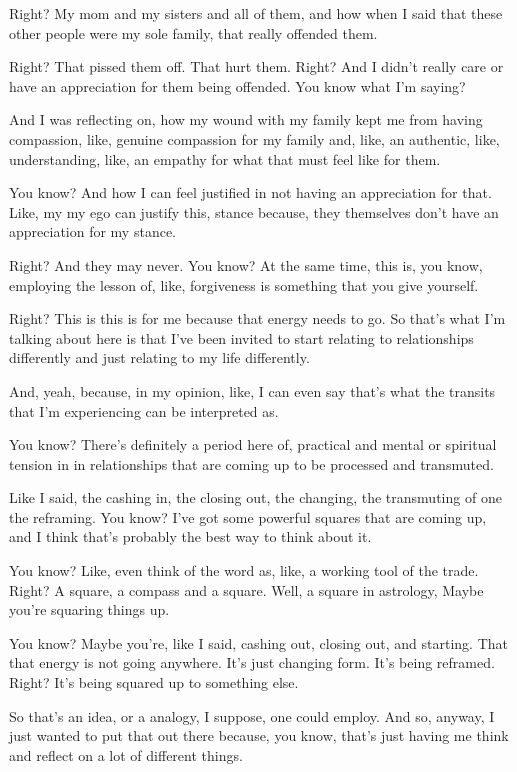 \documentclass{article}
\begin{document}
Right? My mom and my sisters and all of them, and how when I said that these other people were my sole family, that really offended them.

Right? That pissed them off. That hurt them. Right? And I didn't really care or have an appreciation for them being offended. You know what I'm saying?

And I was reflecting on, how my wound with my family kept me from having compassion, like, genuine compassion for my family and, like, an authentic, like, understanding, like, an empathy for what that must feel like for them.

You know? And how I can feel justified in not having an appreciation for that. Like, my my ego can justify this, stance because, they themselves don't have an appreciation for my stance.

Right? And they may never. You know? At the same time, this is, you know, employing the lesson of, like, forgiveness is something that you give yourself.

Right? This is this is for me because that energy needs to go. So that's what I'm talking about here is that I've been invited to start relating to relationships differently and just relating to my life differently.

And, yeah, because, in my opinion, like, I can even say that's what the transits that I'm experiencing can be interpreted as.

You know? There's definitely a period here of, practical and mental or spiritual tension in in relationships that are coming up to be processed and transmuted.

Like I said, the cashing in, the closing out, the changing, the transmuting of one the reframing. You know? I've got some powerful squares that are coming up, and I think that's probably the best way to think about it.

You know? Like, even think of the word as, like, a working tool of the trade. Right? A square, a compass and a square. Well, a square in astrology, Maybe you're squaring things up.

You know? Maybe you're, like I said, cashing out, closing out, and starting. That that energy is not going anywhere. It's just changing form. It's being reframed. Right? It's being squared up to something else.

So that's an idea, or a analogy, I suppose, one could employ. And so, anyway, I just wanted to put that out there because, you know, that's just having me think and reflect on a lot of different things.
\end{document}

